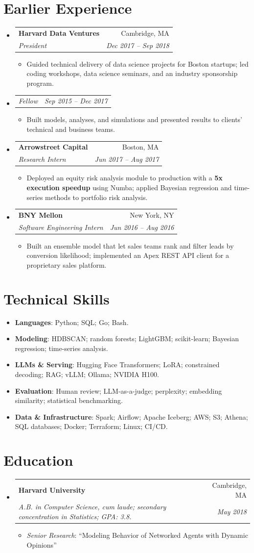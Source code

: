 \documentclass[letterpaper,11pt]{article}
\makeatletter
\newcommand{\resumeItem}[1]{\item #1}
\newcommand{\resumeSubheading}[4]{
  \needspace{5\baselineskip}\item
  \begin{tabular*}{\linewidth}{l@{\extracolsep{\fill}}r}
    \textbf{#1} & #2 \\
    \textit{\small #3} & \textit{\small #4} \\
  \end{tabular*}
}
\newcommand{\resumeSubSubheading}[2]{
  \needspace{4\baselineskip}\item
  \begin{tabular*}{\linewidth}{l@{\extracolsep{\fill}}r}
    \textit{\small #1} & \textit{\small #2} \\
  \end{tabular*}
}
\newcommand{\resumeDetail}[2]{\item\small{\textit{#1}: #2}}
\newcommand{\resumeSkill}[2]{\item\small{\textbf{#1}: #2}}
\newcommand{\resumeSubHeadingListStart}{\begin{itemize}[leftmargin=0pt,label={},itemsep=5pt,topsep=0pt,parsep=0pt]}
\newcommand{\resumeSubHeadingListEnd}{\end{itemize}}
\newcommand{\resumeItemListStart}{\begin{itemize}[leftmargin=1.2em,label=\textbullet,itemsep=3pt,topsep=4pt,parsep=0pt]\small}
\newcommand{\resumeItemListEnd}{\end{itemize}}
\newcommand{\resumeDetailListStart}{\begin{itemize}[leftmargin=0pt,label={},itemsep=3pt,topsep=3pt,parsep=0pt]}
\newcommand{\resumeDetailListEnd}{\end{itemize}}
\makeatother
\begin{document}
\newpage
\section{Earlier Experience}
\resumeSubHeadingListStart
  \resumeSubheading
    {Harvard Data Ventures}{Cambridge, MA}
    {President}{Dec 2017 -- Sep 2018}
  \resumeItemListStart
    \resumeItem{Guided technical delivery of data science projects for Boston startups; led coding workshops, data science seminars, and an industry sponsorship program.}
  \resumeItemListEnd
  \resumeSubSubheading{Fellow}{Sep 2015 -- Dec 2017}
  \resumeItemListStart
    \resumeItem{Built models, analyses, and simulations and presented results to clients' technical and business teams.}
  \resumeItemListEnd

  \resumeSubheading
    {Arrowstreet Capital}{Boston, MA}
    {Research Intern}{Jun 2017 -- Aug 2017}
  \resumeItemListStart
    \resumeItem{Deployed an equity risk analysis module to production with a \textbf{5x execution speedup} using Numba; applied Bayesian regression and time-series methods to portfolio risk analysis.}
  \resumeItemListEnd

  \resumeSubheading
    {BNY Mellon}{New York, NY}
    {Software Engineering Intern}{Jun 2016 -- Aug 2016}
  \resumeItemListStart
    \resumeItem{Built an ensemble model that let sales teams rank and filter leads by conversion likelihood; implemented an Apex REST API client for a proprietary sales platform.}
  \resumeItemListEnd
\resumeSubHeadingListEnd

\section{Technical Skills}
\resumeDetailListStart
  \resumeSkill{Languages}{Python; SQL; Go; Bash.}
  \resumeSkill{Modeling}{HDBSCAN; random forests; LightGBM; scikit-learn; Bayesian regression; time-series analysis.}
  \resumeSkill{LLMs \& Serving}{Hugging Face Transformers; LoRA; constrained decoding; RAG; vLLM; Ollama; NVIDIA H100.}
  \resumeSkill{Evaluation}{Human review; LLM-as-a-judge; perplexity; embedding similarity; statistical benchmarking.}
  \resumeSkill{Data \& Infrastructure}{Spark; Airflow; Apache Iceberg; AWS; S3; Athena; SQL databases; Docker; Terraform; Linux; CI/CD.}
\resumeDetailListEnd

\section{Education}
\resumeSubHeadingListStart
  \resumeSubheading
    {Harvard University}{Cambridge, MA}
    {A.B. in Computer Science, cum laude; secondary concentration in Statistics; GPA: 3.8.}{May 2018}
  \resumeDetailListStart
    \resumeDetail{Senior Research}{``Modeling Behavior of Networked Agents with Dynamic Opinions''}
  \resumeDetailListEnd
\resumeSubHeadingListEnd
\end{document}
